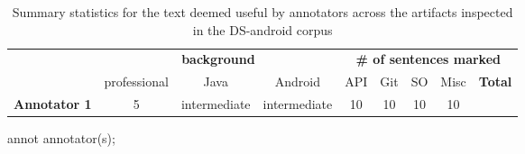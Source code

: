 \begin{table}[H]
\centering    
\caption{Summary statistics for the text deemed useful by annotators across the artifacts inspected in the \acs{DS-android} corpus}
\label{tbl:corpus-summary-per-annotator}
\begin{scriptsize}
\begin{threeparttable}
\begin{tabular}{lcccccccc}




& \multicolumn{3}{c}{\textbf{background}}
& \multicolumn{5}{c}{\textbf{\# of sentences marked}}
\\ \cmidrule(l){2-4} \cmidrule(l){5-9} 



& professional & Java & Android
& API & Git & SO & Misc & \textbf{Total} 
\\

\hline


\textbf{Annotator 1}
& 5 & intermediate & intermediate
& 10 & 10 & 10 & 10 \\









\end{tabular}
\begin{tablenotes}
    \item[annot] annotator(s);
\end{tablenotes}
\end{threeparttable}
\end{scriptsize}
\end{table}

